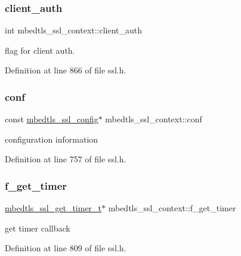 \subsubsection{\texorpdfstring{client\+\_\+auth}{client\_auth}}
{\footnotesize\ttfamily int mbedtls\+\_\+ssl\+\_\+context\+::client\+\_\+auth}

flag for client auth. 

Definition at line 866 of file ssl.\+h.

\mbox{\label{structmbedtls__ssl__context_af91df820bd8e776101c580a89bac9bf7}} 
\subsubsection{\texorpdfstring{conf}{conf}}
{\footnotesize\ttfamily const \mbox{\hyperlink{structmbedtls__ssl__config}{mbedtls\+\_\+ssl\+\_\+config}}$\ast$ mbedtls\+\_\+ssl\+\_\+context\+::conf}

configuration information 

Definition at line 757 of file ssl.\+h.

\mbox{\label{structmbedtls__ssl__context_a4c66906a1b5e82d84f67db66a695fa2c}} 
\subsubsection{\texorpdfstring{f\+\_\+get\+\_\+timer}{f\_get\_timer}}
{\footnotesize\ttfamily \mbox{\hyperlink{ssl_8h_adea005600b532d788c05e9d01b42895b}{mbedtls\+\_\+ssl\+\_\+get\+\_\+timer\+\_\+t}}$\ast$ mbedtls\+\_\+ssl\+\_\+context\+::f\+\_\+get\+\_\+timer}

get timer callback 

Definition at line 809 of file ssl.\+h.

\mbox{\label{structmbedtls__ssl__context_aa3bb4d87f520cd10d1e84af9d3f0bd86}} 
